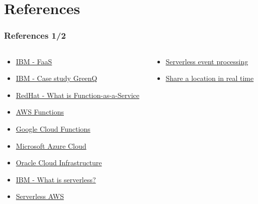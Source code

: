 \documentclass{beamer}
\begin{document}
	\section{References}
	\begin{frame}
		\frametitle{References 1/2}
		\begin{columns}
			\begin{column}{0.5\textwidth}
				\begin{itemize}					
					\item \href{https://www.ibm.com/topics/faas}{IBM - FaaS}
					
					\item \href{https://www.ibm.com/case-studies/greenq-ltd}{IBM - Case study GreenQ}
					
					\item \href{https://www.redhat.com/en/topics/cloud-native-apps/what-is-faas}{RedHat - What is Function-as-a-Service}
					
					\item \href{https://aws.amazon.com/}{AWS Functions}
					
					\item \href{https://cloud.google.com/functions}{Google Cloud Functions}
					
					\item \href{https://azure.microsoft.com/en-gb/resources/cloud-computing-dictionary/what-is-azure/}{Microsoft Azure Cloud}
					
					\item \href{https://www.oracle.com/cloud/}{Oracle Cloud Infrastructure}
					
					\item \href{https://www.ibm.com/topics/serverless}{IBM - What is serverless?}
					
					\item \href{https://aws.amazon.com/serverless/}{Serverless AWS}
				\end{itemize}
			\end{column}
			\begin{column}{0.5\textwidth}
				\begin{itemize}
					\item \href{https://learn.microsoft.com/en-us/azure/architecture/reference-architectures/serverless/event-processing}{Serverless event processing}
					
					\item \href{https://learn.microsoft.com/en-us/azure/architecture/example-scenario/signalr/}{Share a location in real time}
					

\end{itemize}
\end{column}
\end{columns}
\end{frame}
\end{document}
